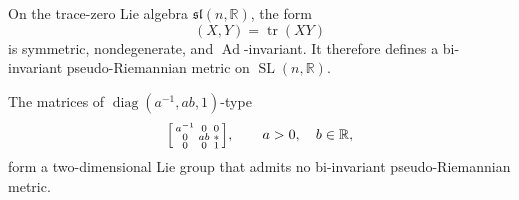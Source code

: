 \begin{remark}
  \label{rem:pet-ch1-ex-28}
  \leanok
  On the trace-zero Lie algebra $\mathfrak{sl}(n,\mathbb{R})$, the form
  \[
    (X,Y)=\operatorname{tr}(XY)
  \]
  is symmetric, nondegenerate, and $\operatorname{Ad}$-invariant. It therefore
  defines a bi-invariant pseudo-Riemannian metric on
  $\operatorname{SL}(n,\mathbb{R})$.
\end{remark}

\begin{remark}
  \label{rem:pet-ch1-ex-29}
  \leanok
  The matrices of $\operatorname{diag}(a^{-1},ab,1)$-type
  \[
    \begin{bsmallmatrix}
      a^{-1}&0&0\\0&ab&\ast\\0&0&1
    \end{bsmallmatrix},
    \qquad a>0,\quad b\in\mathbb{R},
  \]
  form a two-dimensional Lie group that admits no bi-invariant
  pseudo-Riemannian metric.
\end{remark}
